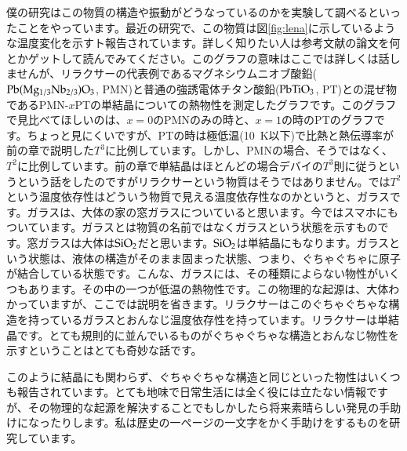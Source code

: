 \documentclass[10pt,b5paper,papersize,dvipdfmx]{jsbook}
\begin{document}
僕の研究はこの物質の構造や振動がどうなっているのかを実験して調べるといったことをやっています。最近の研究で、この物質は図\ref{fig:lena}に示しているような温度変化を示すト報告されています。詳しく知りたい人は参考文献\cite{relaxCT}の論文を何とかゲットして読んでみてください。このグラフの意味はここでは詳しくは話しませんが、リラクサーの代表例であるマグネシウムニオブ酸鉛($\rm{Pb(Mg_{1/3}Nb_{2/3})O_3}$, PMN)と普通の強誘電体チタン酸鉛($\rm{PbTiO_3}$, PT)との混ぜ物であるPMN-$x$PTの単結晶についての熱物性を測定したグラフです。このグラフで見比べてほしいのは、$x = 0$のPMNのみの時と、$x = 1$の時のPTのグラフです。ちょっと見にくいですが、PTの時は極低温(10~K以下)で比熱と熱伝導率が前の章で説明した$T^3$に比例しています。しかし、PMNの場合、そうではなく、$T^2$に比例しています。前の章で単結晶はほとんどの場合デバイの$T^3$則に従うというという話をしたのですがリラクサーという物質はそうではありません。では$T^2$という温度依存性はどういう物質で見える温度依存性なのかというと、ガラスです。ガラスは、大体の家の窓ガラスについていると思います。今ではスマホにもついています。ガラスとは物質の名前ではなくガラスという状態を示すものです。窓ガラスは大体は$\rm{SiO}_2$だと思います。$\rm{SiO}_2$は単結晶にもなります。ガラスという状態は、液体の構造がそのまま固まった状態、つまり、ぐちゃぐちゃに原子が結合している状態です。こんな、ガラスには、その種類によらない物性がいくつもあります。その中の一つが低温の熱物性です。この物理的な起源は、大体わかっていますが、ここでは説明を省きます。リラクサーはこのぐちゃぐちゃな構造を持っているガラスとおんなじ温度依存性を持っています。リラクサーは単結晶です。とても規則的に並んでいるものがぐちゃぐちゃな構造とおんなじ物性を示すということはとても奇妙な話です。\par
このように結晶にも関わらず、ぐちゃぐちゃな構造と同じといった物性はいくつも報告されています。とても地味で日常生活には全く役には立たない情報ですが、その物理的な起源を解決することでもしかしたら将来素晴らしい発見の手助けになったりします。私は歴史の一ページの一文字をかく手助けをするものを研究しています。
\end{document}

